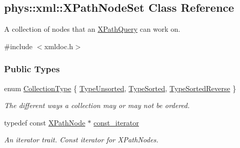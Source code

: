 \hypertarget{classphys_1_1xml_1_1XPathNodeSet}{
\subsection{phys::xml::XPathNodeSet Class Reference}
\label{classphys_1_1xml_1_1XPathNodeSet}
}


A collection of nodes that an \hyperlink{classphys_1_1xml_1_1XPathQuery}{XPathQuery} can work on.  




{\ttfamily \#include $<$xmldoc.h$>$}

\subsubsection*{Public Types}
\begin{DoxyCompactItemize}
\item 
enum \hyperlink{classphys_1_1xml_1_1XPathNodeSet_ab178d39e119369702541033c067a995c}{CollectionType} \{ \hyperlink{classphys_1_1xml_1_1XPathNodeSet_ab178d39e119369702541033c067a995ca8f4fe063043fb03da3c074b4c6c7879c}{TypeUnsorted}, 
\hyperlink{classphys_1_1xml_1_1XPathNodeSet_ab178d39e119369702541033c067a995ca1a79973b465ba264dfaae55836121be2}{TypeSorted}, 
\hyperlink{classphys_1_1xml_1_1XPathNodeSet_ab178d39e119369702541033c067a995caea04d0c99f11c8b4deeccb6316911420}{TypeSortedReverse}
 \}
\begin{DoxyCompactList}\small\item\em The different ways a collection may or may not be ordered. \item\end{DoxyCompactList}\item 
\hypertarget{classphys_1_1xml_1_1XPathNodeSet_a64ed5a3479ae329b0753354dcceba7d3}{
typedef const \hyperlink{classphys_1_1xml_1_1XPathNode}{XPathNode} $\ast$ \hyperlink{classphys_1_1xml_1_1XPathNodeSet_a64ed5a3479ae329b0753354dcceba7d3}{const\_\-iterator}}
\label{classphys_1_1xml_1_1XPathNodeSet_a64ed5a3479ae329b0753354dcceba7d3}

\begin{DoxyCompactList}\small\item\em An iterator trait. Const iterator for XPathNodes. \item\end{DoxyCompactList}\end{DoxyCompactItemize}
